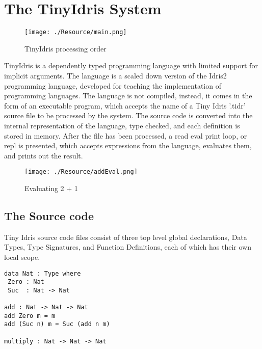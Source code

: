 \documentclass[a4paper]{article}
\begin{document}
\clearpage

\section{The TinyIdris System}
\label{sec:org2a24981}

\begin{center}
\begin{figure}[htbp]
\centering
\texttt{[image: ./Resource/main.png]}
\caption{TinyIdris processing order}
\end{figure}
\end{center}

TinyIdris is a dependently typed programming language with limited support
for implicit arguments. The language is a scaled down version of the 
Idris2 programming language, developed for teaching the implementation
of programming languages. The language is not compiled, instead, it comes
in the form of an executable program, which accepts the name of a 
Tiny Idris '.tidr' source file to be processed by the system.
The source code is converted into the internal representation of
the language, type checked, and each definition is stored in
memory. After the file has been processed, a read eval print loop, or 
repl is presented, which accepts expressions from the language,
evaluates them, and prints out the result.

\begin{center}
\begin{figure}[htbp]
\centering
\texttt{[image: ./Resource/addEval.png]}
\caption{Evaluating 2 + 1}
\end{figure}
\end{center}

\subsection{The Source code}
\label{sec:org85decd2}
Tiny Idris source code files consist of three top level global 
declarations, Data Types, Type Signatures, and Function Definitions,
each of which has their own local scope. 

\begin{center}
\begin{verbatim}
data Nat : Type where
 Zero : Nat
 Suc  : Nat -> Nat

add : Nat -> Nat -> Nat
add Zero m = m
add (Suc n) m = Suc (add n m) 

multiply : Nat -> Nat -> Nat
\end{verbatim}
\end{center}
\end{document}
